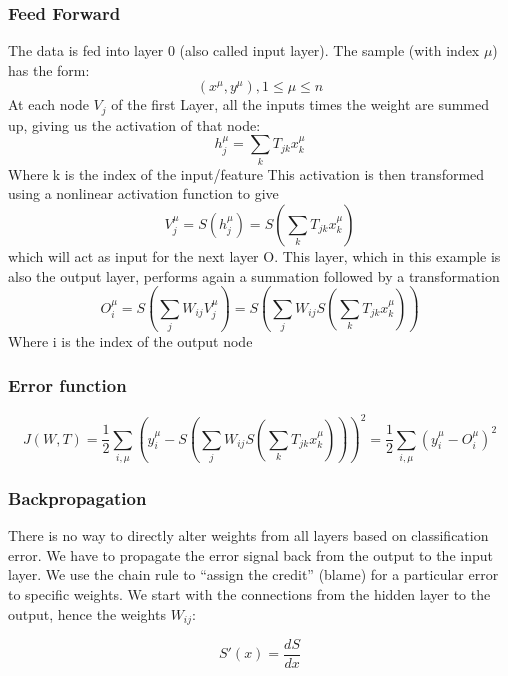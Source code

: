 \documentclass[main]{subfiles}
\begin{document}
\subsubsection{Feed Forward}
The data is fed into layer 0 (also called input layer).
The sample (with index $\mu$)   has the form:
\begin{equation}
(x^{\mu},y^{\mu}),  1 \leq \mu \leq n
\end{equation}
At each node $V_j$ of the first Layer, all the inputs times the weight are summed up, giving us the activation of that node:
\begin{equation}
h_j^{\mu}=\sum_k T_{jk}x_k^{\mu}
\end{equation}
Where k is the index of the input/feature
This activation is then transformed using a nonlinear activation function to give
\begin{equation}
V_j^{\mu}=S(h_j^{\mu})=S(\sum_k T_{jk}x_k^{\mu})
\end{equation}
which will act as input for the next layer O. This layer, which in this example is also the output layer, performs again a summation followed by a transformation
\begin{equation}
O_i^{\mu}=S(\sum_j W_{ij}V_j^{\mu})=S(\sum_j W_{ij}S(\sum_k T_{jk}x_k^{\mu}))
\end{equation}
Where i is the index of the output node

\subsubsection{Error function}
\begin{equation}
J(W,T)=\frac{1}{2}\sum_{i,\mu}(y_i^{\mu}-S(\sum_j W_{ij}S(\sum_k T_{jk}x_k^{\mu})))^2=\frac{1}{2}\sum_{i,\mu}(y_i^{\mu}-O_i^{\mu})^2
\end{equation}

\subsubsection{Backpropagation}
There is no way to directly alter weights from all layers based on classification error. We have to propagate the error signal back from the output to the input layer. We use the chain rule to “assign the credit” (blame) for a
particular error to specific weights.
We start with the connections from the hidden layer to the output, hence the weights $W_{ij}$:

\begin{equation}
S'(x) = \frac{dS}{dx}
\end{equation}
\end{document}
